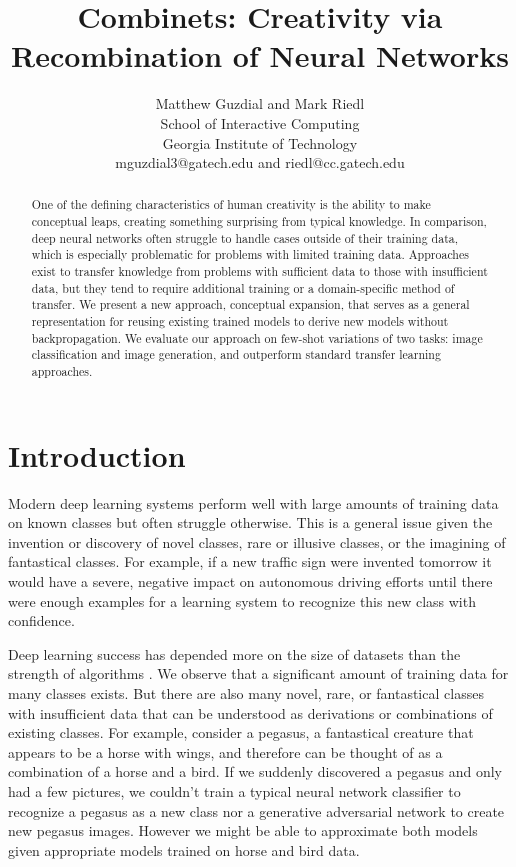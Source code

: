 \documentclass[letterpaper]{article}
\begin{document}

\title{Combinets: Creativity via Recombination of Neural Networks}
\author{Matthew Guzdial and Mark Riedl\\
School of Interactive Computing\\
Georgia Institute of Technology\\
mguzdial3@gatech.edu and riedl@cc.gatech.edu\\
}
\maketitle

\begin{abstract}
One of the defining characteristics of human creativity is the ability to make conceptual leaps, creating something surprising from typical knowledge.
In comparison, deep neural networks often struggle to handle cases outside of their training data, which is especially problematic for problems with limited training data.
Approaches exist to transfer knowledge from problems with sufficient data to those with insufficient data, but they tend to require additional training or a domain-specific method of transfer.
We present a new approach, conceptual expansion, that serves as a general representation for reusing existing trained models to derive new models without backpropagation.
We evaluate our approach on few-shot variations of two tasks: image classification and image generation, and outperform standard transfer learning approaches.

\end{abstract}

\section{Introduction}

Modern deep learning systems perform well with large amounts of training data on known classes but often struggle otherwise. This is a general issue given the invention or discovery of novel classes, rare or illusive classes, or the imagining of fantastical classes. For example, if a new traffic sign were invented tomorrow it would have a severe, negative impact on autonomous driving efforts until there were enough examples for a learning system to recognize this new class with confidence.

Deep learning success has depended more on the size of datasets than the strength of algorithms \cite{UnreasonableEffectivenessOfData}. 
We observe that a significant amount of training data for many classes exists. 
But there are also many novel, rare, or fantastical classes with insufficient data that can be understood as derivations or combinations of existing classes. 
For example, consider a pegasus, a fantastical creature that appears to be a horse with wings, and therefore can be thought of as a combination of a horse and a bird. 
If we suddenly discovered a pegasus and only had a few pictures, we couldn't train a typical neural network classifier to recognize a pegasus as a new class nor a generative adversarial network to create new pegasus images. 
However we might be able to approximate both models given appropriate models trained on horse and bird data.
\end{document}
